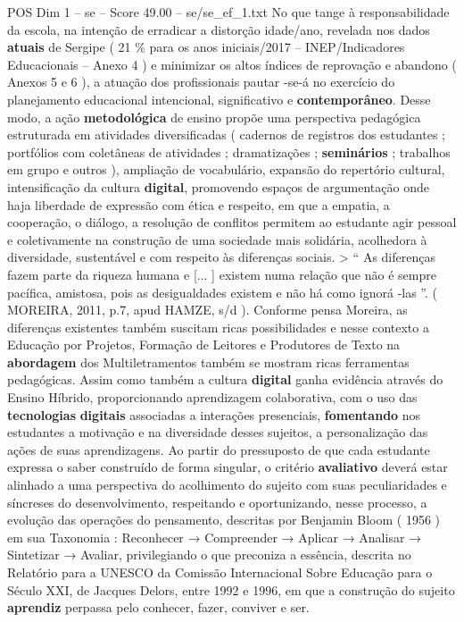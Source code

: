 \begin{textsample}{POS Dim 1 – se – Score 49.00 – se/se\_ef\_1.txt}
No que tange à responsabilidade da escola, na intenção de erradicar a distorção idade/ano, revelada nos dados \textbf{atuais} de Sergipe ( 21 \% para os anos iniciais/2017 – INEP/Indicadores Educacionais – Anexo 4 ) e minimizar os altos índices de reprovação e abandono ( Anexos 5 e 6 ), a atuação dos profissionais pautar -se-á no exercício do planejamento educacional intencional, significativo e \textbf{contemporâneo}.
Desse modo, a ação \textbf{metodológica} de ensino propõe uma perspectiva pedagógica estruturada em atividades diversificadas ( cadernos de registros dos estudantes ; portfólios com coletâneas de atividades ; dramatizações ; \textbf{seminários} ; trabalhos em grupo e outros ), ampliação de vocabulário, expansão do repertório cultural, intensificação da cultura \textbf{digital}, promovendo espaços de argumentação onde haja liberdade de expressão com ética e respeito, em que a empatia, a cooperação, o diálogo, a resolução de conflitos permitem ao estudante agir pessoal e coletivamente na construção de uma sociedade mais solidária, acolhedora à diversidade, sustentável e com respeito às diferenças sociais. > “ As diferenças fazem parte da riqueza humana e [... ] existem numa relação que não é sempre pacífica, amistosa, pois as desigualdades existem e não há como ignorá -las ”. ( MOREIRA, 2011, p.7, apud HAMZE, s/d ).
Conforme pensa Moreira, as diferenças existentes também suscitam ricas possibilidades e nesse contexto a Educação por Projetos, Formação de Leitores e Produtores de Texto na \textbf{abordagem} dos Multiletramentos também se mostram ricas ferramentas pedagógicas.
Assim como também a cultura \textbf{digital} ganha evidência através do Ensino Híbrido, proporcionando aprendizagem colaborativa, com o uso das \textbf{tecnologias} \textbf{digitais} associadas a interações presenciais, \textbf{fomentando} nos estudantes a motivação e na diversidade desses sujeitos, a personalização das ações de suas aprendizagens.
Ao partir do pressuposto de que cada estudante expressa o saber construído de forma singular, o critério \textbf{avaliativo} deverá estar alinhado a uma perspectiva do acolhimento do sujeito com suas peculiaridades e síncreses do desenvolvimento, respeitando e oportunizando, nesse processo, a evolução das operações do pensamento, descritas por Benjamin Bloom ( 1956 ) em sua Taxonomia : Reconhecer → Compreender → Aplicar → Analisar → Sintetizar → Avaliar, privilegiando o que preconiza a essência, descrita no Relatório para a UNESCO da Comissão Internacional Sobre Educação para o Século XXI, de Jacques Delors, entre 1992 e 1996, em que a construção do sujeito \textbf{aprendiz} perpassa pelo conhecer, fazer, conviver e ser.

\end{textsample}
